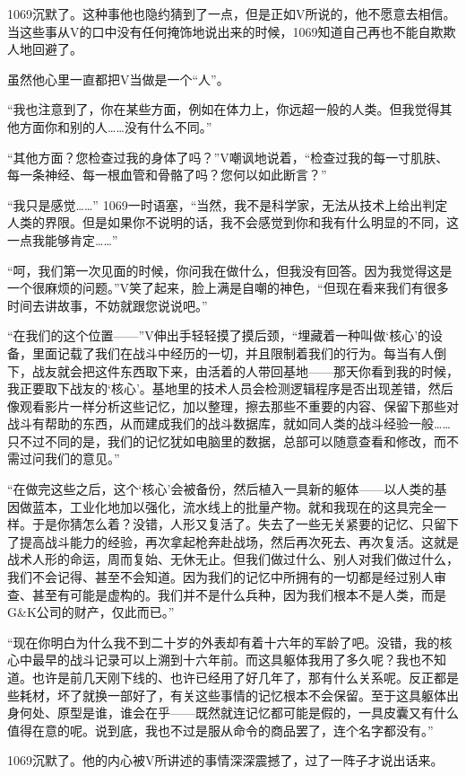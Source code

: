 1069沉默了。这种事他也隐约猜到了一点，但是正如V所说的，他不愿意去相信。当这些事从V的口中没有任何掩饰地说出来的时候，1069知道自己再也不能自欺欺人地回避了。

虽然他心里一直都把V当做是一个“人”。

“我也注意到了，你在某些方面，例如在体力上，你远超一般的人类。但我觉得其他方面你和别的人……没有什么不同。”

“其他方面？您检查过我的身体了吗？”V嘲讽地说着，“检查过我的每一寸肌肤、每一条神经、每一根血管和骨骼了吗？您何以如此断言？”

“我只是感觉……” 1069一时语塞，“当然，我不是科学家，无法从技术上给出判定人类的界限。但是如果你不说明的话，我不会感觉到你和我有什么明显的不同，这一点我能够肯定……”

“呵，我们第一次见面的时候，你问我在做什么，但我没有回答。因为我觉得这是一个很麻烦的问题。”V笑了起来，脸上满是自嘲的神色，“但现在看来我们有很多时间去讲故事，不妨就跟您说说吧。”

“在我们的这个位置——”V伸出手轻轻摸了摸后颈，“埋藏着一种叫做‘核心’的设备，里面记载了我们在战斗中经历的一切，并且限制着我们的行为。每当有人倒下，战友就会把这件东西取下来，由活着的人带回基地——那天你看到我的时候，我正要取下战友的‘核心’。基地里的技术人员会检测逻辑程序是否出现差错，然后像观看影片一样分析这些记忆，加以整理，擦去那些不重要的内容、保留下那些对战斗有帮助的东西，从而建成我们的战斗数据库，就如同人类的战斗经验一般……只不过不同的是，我们的记忆犹如电脑里的数据，总部可以随意查看和修改，而不需过问我们的意见。”

“在做完这些之后，这个‘核心’会被备份，然后植入一具新的躯体——以人类的基因做蓝本，工业化地加以强化，流水线上的批量产物。就和我现在的这具完全一样。于是你猜怎么着？没错，人形又复活了。失去了一些无关紧要的记忆、只留下了提高战斗能力的经验，再次拿起枪奔赴战场，然后再次死去、再次复活。这就是战术人形的命运，周而复始、无休无止。但我们做过什么、别人对我们做过什么，我们不会记得、甚至不会知道。因为我们的记忆中所拥有的一切都是经过别人审查、甚至有可能是虚构的。我们并不是什么兵种，因为我们根本不是人类，而是G\&K公司的财产，仅此而已。”

“现在你明白为什么我不到二十岁的外表却有着十六年的军龄了吧。没错，我的核心中最早的战斗记录可以上溯到十六年前。而这具躯体我用了多久呢？我也不知道。也许是前几天刚下线的、也许已经用了好几年了，那有什么关系呢。反正都是些耗材，坏了就换一部好了，有关这些事情的记忆根本不会保留。至于这具躯体出身何处、原型是谁，谁会在乎——既然就连记忆都可能是假的，一具皮囊又有什么值得在意的呢。说到底，我也不过是服从命令的商品罢了，连个名字都没有。”

1069沉默了。他的内心被V所讲述的事情深深震撼了，过了一阵子才说出话来。

